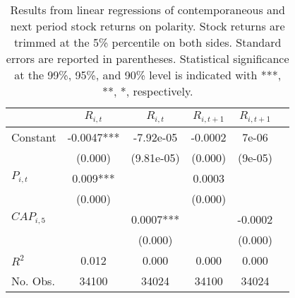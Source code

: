 \begin{table}[]
\centering
\begin{tabular}{l|c|c|c|c|c}
                     & $R_{i,t}$ & $R_{i,t}$   & $R_{i,t+1}$ & $R_{i,t+1}$        \\ \toprule 
Constant             & -0.0047*** & -7.92e-05   & -0.0002    & 7e-06         \\
                     & (0.000)    & (9.81e-05)  & (0.000)    & (9e-05)       \\
$P_{i,t}$           & 0.009***   &               & 0.0003     &               \\
                     & (0.000)    &               & (0.000)    &               \\
$CAP_{i,5}$         &            & 0.0007***     &            & -0.0002       \\
                     &            & (0.000)       &            & (0.000)       \\ \bottomrule
$R^2$                & 0.012      & 0.000         & 0.000      & 0.000              \\
No. Obs.             & 34100      & 34024         & 34100      & 34024             
\end{tabular}
\caption{Results from linear regressions of contemporaneous and next period stock returns on polarity. Stock returns are trimmed at the 5\% percentile on both sides. Standard errors are reported in parentheses. Statistical significance at the 99\%, 95\%, and 90\% level is indicated with ***, **, *, respectively.}
\label{regpolret}
\end{table}



